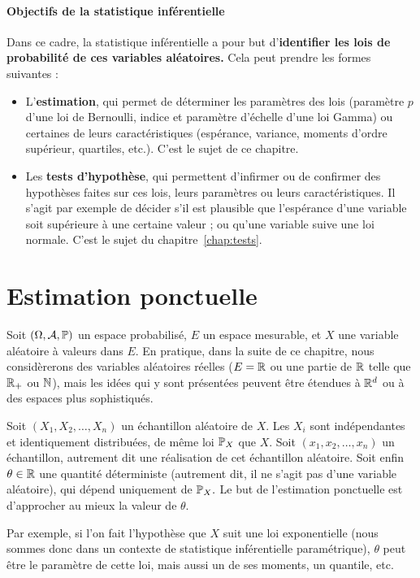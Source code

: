 \paragraph{Objectifs de la statistique inférentielle} Dans ce cadre, la statistique inférentielle a pour but d'\textbf{iden\-tifier les lois de probabilité de ces variables aléatoires.} Cela peut prendre les
formes suivantes :
\begin{itemize}
\item L'\textbf{estimation}, qui permet de déterminer les paramètres des lois (paramètre $p$ d'une loi de Bernoulli, indice et paramètre d'échelle d'une loi Gamma) ou certaines de leurs caractéristiques (espérance, variance, moments d'ordre supérieur, quartiles, etc.). C'est le sujet de ce chapitre.
\item Les \textbf{tests d'hypothèse}, qui permettent d'infirmer ou de confirmer des hypothèses faites sur ces lois, leurs paramètres ou leurs
  caractéristiques. Il s'agit par exemple de décider s'il est plausible que
  l'espérance d'une variable soit supérieure à une certaine valeur ; ou qu'une
  variable suive une loi normale. C'est le sujet du chapitre~\ref{chap:tests}. %
\end{itemize}



\section{Estimation ponctuelle}
Soit $(\Omega, \mathcal{A}, \mathbb{P})$ un espace probabilisé, $E$ un espace mesurable, et
$X$ une variable aléatoire à valeurs dans $E$. En pratique, dans la suite de ce
chapitre, nous considèrerons des variables aléatoires réelles ($E = \mathbb{R}$ ou une
partie de $\mathbb{R}$ telle que $\mathbb{R}_+$ ou $\mathbb{N}$), mais les idées qui y sont
présentées peuvent être étendues à $\mathbb{R}^d$ ou à des espaces plus sophistiqués.

Soit $(X_1, X_2, \dots, X_n)$ un échantillon aléatoire de $X$. Les $X_i$ sont
indépendantes et identiquement distribuées, de même loi $\mathbb{P}_X$ que $X.$ Soit
$(x_1, x_2, \dots, x_n)$ un échantillon, autrement dit une réalisation de cet
échantillon aléatoire. Soit enfin $\theta \in \mathbb{R}$ une quantité déterministe
(autrement dit, il ne s'agit pas d'une variable aléatoire), qui dépend
uniquement de $\mathbb{P}_X.$ Le but de l'estimation ponctuelle est d'approcher au
mieux la valeur de $\theta$.

Par exemple, si l'on fait l'hypothèse que $X$ suit une loi exponentielle (nous
sommes donc dans un contexte de statistique inférentielle paramétrique),
$\theta$ peut être le paramètre de cette loi, mais aussi un de ses moments, un
quantile, etc.


